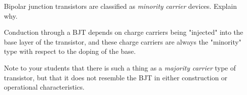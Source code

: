 

Bipolar junction transistors are classified as {\it minority carrier} devices.  Explain why.







Conduction through a BJT depends on charge carriers being "injected" into the base layer of the transistor, and these charge carriers are always the "minority" type with respect to the doping of the base.







Note to your students that there is such a thing as a {\it majority carrier} type of transistor, but that it does not resemble the BJT in either construction or operational characteristics.




